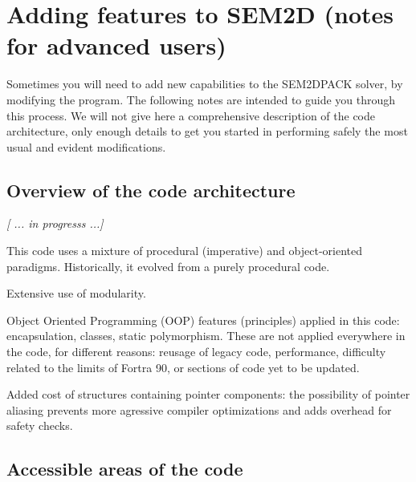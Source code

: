 \chapter{Adding features to SEM2D (notes for advanced users)}
\label{Cha:add}

Sometimes you will need to add new capabilities to the
SEM2DPACK solver, by modifying the program.
The following notes are intended to guide you through this process.
We will not give here a comprehensive description of the code architecture,
only enough details to get you started in performing safely
the most usual and evident modifications.

\section{Overview of the code architecture}

{\it [ ... in progresss ...]}

This code uses a mixture of procedural (imperative) and object-oriented paradigms.
Historically, it evolved from a purely procedural code.

Extensive use of modularity.

Object Oriented Programming (OOP) features (principles) applied in this code:
encapsulation, classes, %
static polymorphism. 
These are not applied everywhere in the code, for different reasons:
reusage of legacy code, performance, 
difficulty related to the limits of Fortra 90, 
or sections of code yet to be updated. 

Added cost of structures containing pointer components: 
the possibility of pointer aliasing prevents more agressive compiler optimizations
and adds overhead for safety checks.

\section{Accessible areas of the code}

